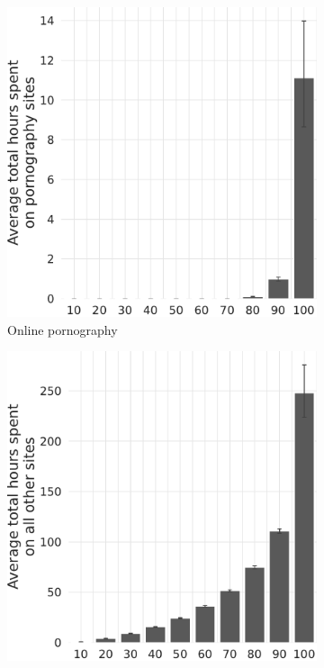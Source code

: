 \documentclass[12pt,twoside]{article}
\begin{document}
\begin{figure}[!ht]
     \centering
     \begin{subfigure}[b]{0.495\textwidth}
         \centering
         \includegraphics[width=\textwidth]{figs/distribution_duration_on_adultsites_fullsample.pdf}
         \caption{Online pornography}
     \end{subfigure}
     \hfill
     \begin{subfigure}[b]{0.495\textwidth}
         \centering
         \includegraphics[width=\textwidth]{figs/distribution_duration_on_nonadultsites_fullsample.pdf}

\end{subfigure}
\end{figure}
\end{document}
